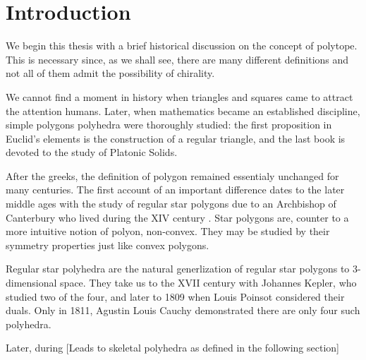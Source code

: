 \documentclass[spanish]{article}
\theoremstyle{definition}
\begin{document}
	\section{Introduction}
	We begin this thesis with a brief historical discussion on the concept of polytope. This is necessary since, as we shall see, there are many different definitions and not all of them admit the possibility of chirality.
	
	We cannot find a moment in history when triangles and squares came to attract the attention humans. Later, when mathematics became an established discipline, simple polygons polyhedra were thoroughly studied: the first proposition in Euclid's elements is the construction of a regular triangle, and the last book is devoted to the study of Platonic Solids.
	
	After the greeks, the definition of polygon remained essentialy unchanged for many centuries. The first account of an important difference dates to the later middle ages with the study of regular star polygons due to an Archbishop of Canterbury who lived during the XIV century \cite{abstract-polytopes}. Star polygons are, counter to a more intuitive notion of polyon, non-convex. They may be studied by their symmetry properties just like convex polygons.
	
	Regular star polyhedra are the natural generlization of regular star polygons to 3-dimensional space. They take us to the XVII century with Johannes Kepler, who studied two of the four, and later to 1809 when Louis Poinsot considered their duals. Only in 1811, Agustin Louis Cauchy demonstrated there are only four such polyhedra.
	
	Later, during [Leads to skeletal polyhedra as defined in the following section]
	
\end{document}
